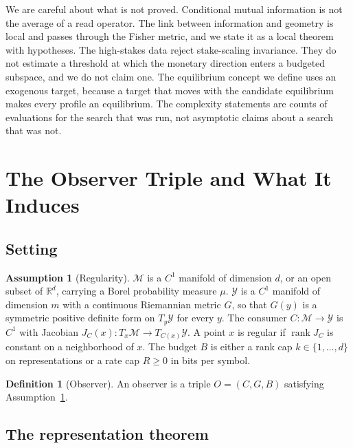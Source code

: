 \documentclass[11pt]{article}
\theoremstyle{definition}
\newtheorem{definition}{Definition}
\newtheorem{assumption}{Assumption}
\theoremstyle{remark}
\newcommand{\M}{\mathcal{M}}
\newcommand{\Y}{\mathcal{Y}}
\newcommand{\R}{\mathbb{R}}
\newcommand{\rank}{\operatorname{rank}}
\begin{document}
We are careful about what is not proved.
Conditional mutual information is not the average of a read operator.
The link between information and geometry is local and passes through the Fisher metric, and we state it as a local theorem with hypotheses.
The high-stakes data reject stake-scaling invariance.
They do not estimate a threshold at which the monetary direction enters a budgeted subspace, and we do not claim one.
The equilibrium concept we define uses an exogenous target, because a target that moves with the candidate equilibrium makes every profile an equilibrium.
The complexity statements are counts of evaluations for the search that was run, not asymptotic claims about a search that was not.

\section{The Observer Triple and What It Induces}
\label{sec:triple}

\subsection{Setting}

\begin{assumption}[Regularity]
\label{ass:reg}
$\M$ is a $C^{1}$ manifold of dimension $d$, or an open subset of $\R^{d}$, carrying a Borel probability measure $\mu$.
$\Y$ is a $C^{1}$ manifold of dimension $m$ with a continuous Riemannian metric $G$, so that $G(y)$ is a symmetric positive definite form on $T_{y}\Y$ for every $y$.
The consumer $C:\M\to\Y$ is $C^{1}$ with Jacobian $J_{C}(x):T_{x}\M\to T_{C(x)}\Y$.
A point $x$ is regular if $\rank J_{C}$ is constant on a neighborhood of $x$.
The budget $B$ is either a rank cap $k\in\{1,\dots,d\}$ on representations or a rate cap $R\ge0$ in bits per symbol.
\end{assumption}

\begin{definition}[Observer]
An observer is a triple $O=(C,G,B)$ satisfying Assumption~\ref{ass:reg}.
\end{definition}

\subsection{The representation theorem}
\end{document}
